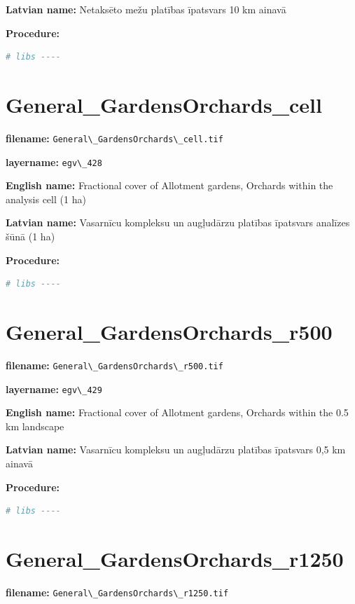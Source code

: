 \documentclass[
]{book}
\newcommand{\passthrough}[1]{#1}
\begin{document}
\textbf{Latvian name:} Netaksēto mežu platības īpatsvars 10 km ainavā

\textbf{Procedure:}

\begin{lstlisting}[language=R]
# libs ----
\end{lstlisting}

\section{General\_GardensOrchards\_cell}\label{ch06.428}

\textbf{filename:} \passthrough{\lstinline!General\_GardensOrchards\_cell.tif!}

\textbf{layername:} \passthrough{\lstinline!egv\_428!}

\textbf{English name:} Fractional cover of Allotment gardens, Orchards within the analysis cell (1 ha)

\textbf{Latvian name:} Vasarnīcu kompleksu un augļudārzu platības īpatsvars analīzes šūnā (1 ha)

\textbf{Procedure:}

\begin{lstlisting}[language=R]
# libs ----
\end{lstlisting}

\section{General\_GardensOrchards\_r500}\label{ch06.429}

\textbf{filename:} \passthrough{\lstinline!General\_GardensOrchards\_r500.tif!}

\textbf{layername:} \passthrough{\lstinline!egv\_429!}

\textbf{English name:} Fractional cover of Allotment gardens, Orchards within the 0.5 km landscape

\textbf{Latvian name:} Vasarnīcu kompleksu un augļudārzu platības īpatsvars 0,5 km ainavā

\textbf{Procedure:}

\begin{lstlisting}[language=R]
# libs ----
\end{lstlisting}

\section{General\_GardensOrchards\_r1250}\label{ch06.430}

\textbf{filename:} \passthrough{\lstinline!General\_GardensOrchards\_r1250.tif!}
\end{document}
